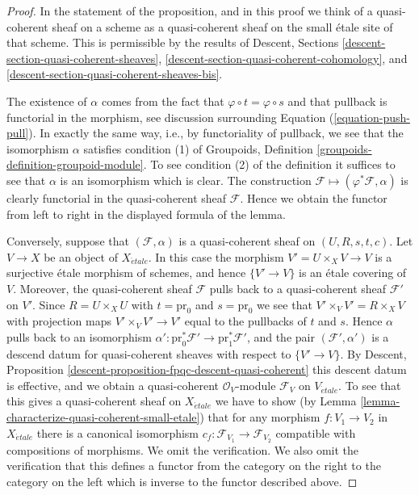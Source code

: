 \documentclass{stacks-project}
\theoremstyle{plain}
\theoremstyle{definition}
\theoremstyle{remark}
\numberwithin{equation}{subsection}
\def\etale{{\acute{e}tale}}
\begin{document}
\begin{proof}
In the statement of the proposition, and in this proof we think of a
quasi-coherent sheaf on a scheme as a quasi-coherent sheaf on the small
\'etale site of that scheme. This is permissible by the results of
Descent, Sections \ref{descent-section-quasi-coherent-sheaves},
\ref{descent-section-quasi-coherent-cohomology}, and
\ref{descent-section-quasi-coherent-sheaves-bis}.

\medskip\noindent
The existence of $\alpha$ comes from the fact that
$\varphi \circ t = \varphi \circ s$ and that pullback is
functorial in the morphism, see discussion surrounding
Equation (\ref{equation-push-pull}). In exactly the same way, i.e., by
functoriality of pullback, we see that the isomorphism $\alpha$ satisfies
condition (1) of
Groupoids, Definition \ref{groupoids-definition-groupoid-module}.
To see condition (2) of the definition it suffices to see that $\alpha$
is an isomorphism which is clear. The construction
$\mathcal{F} \mapsto (\varphi^*\mathcal{F}, \alpha)$
is clearly functorial in the quasi-coherent sheaf $\mathcal{F}$.
Hence we obtain the functor from left to right in the displayed
formula of the lemma.

\medskip\noindent
Conversely, suppose that $(\mathcal{F}, \alpha)$ is a quasi-coherent
sheaf on $(U, R, s, t, c)$. Let $V \to X$ be an object of $X_\etale$.
In this case the morphism $V' = U \times_X V \to V$ is a surjective \'etale
morphism of schemes, and hence $\{V' \to V\}$ is an \'etale
covering of $V$. Moreover, the quasi-coherent sheaf $\mathcal{F}$
pulls back to a quasi-coherent sheaf $\mathcal{F}'$ on $V'$.
Since $R = U \times_X U$ with $t = \text{pr}_0$ and $s = \text{pr}_0$
we see that $V' \times_V V' = R \times_X V$ with projection maps
$V' \times_V V' \to V'$ equal to the pullbacks of $t$ and $s$. Hence
$\alpha$ pulls back to an isomorphism
$\alpha' : \text{pr}_0^*\mathcal{F}' \to \text{pr}_1^*\mathcal{F}'$, and
the pair $(\mathcal{F}', \alpha')$ is a descend datum for quasi-coherent
sheaves with respect to $\{V' \to V\}$. By
Descent, Proposition
\ref{descent-proposition-fpqc-descent-quasi-coherent}
this descent datum is effective, and we obtain a quasi-coherent
$\mathcal{O}_V$-module $\mathcal{F}_V$ on $V_\etale$.
To see that this gives a quasi-coherent sheaf on $X_\etale$ we have
to show (by
Lemma \ref{lemma-characterize-quasi-coherent-small-etale})
that for any morphism $f : V_1 \to V_2$ in $X_\etale$
there is a canonical isomorphism
$c_f : \mathcal{F}_{V_1} \to \mathcal{F}_{V_2}$
compatible with compositions of morphisms. We omit the verification.
We also omit the verification that this defines a functor from the
category on the right to the category on the left which is inverse
to the functor described above.
\end{proof}
\end{document}
